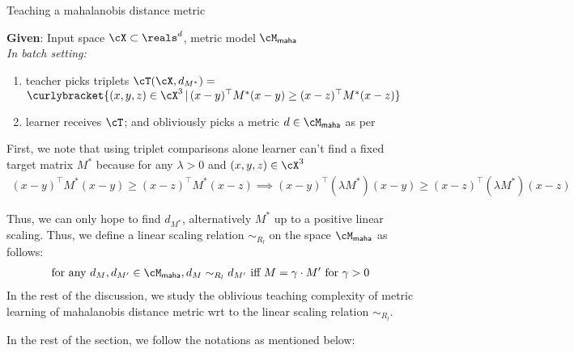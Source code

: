 \begin{algorithm}[H]
\caption{Teaching a mahalanobis distance metric}
\label{alg: maha}
\textbf{Given}: Input space $\cX \subset \reals^d$, metric model $\cM_{\mathsf{maha}}$\\
\vspace{1mm}
\textit{In batch setting:}\vspace{1mm}
\begin{enumerate}
    \item teacher picks triplets $\cT(\cX,d_{M^*}) =$ $\curlybracket{(x,y,z) \in \cX^3 \,|\, (x-y)^{\top}M^*(x-y) \ge (x-z)^{\top}M^*(x-z)}$
    \item learner receives $\cT$; and obliviously picks a metric $d \in \cM_{\mathsf{maha}}$ as per 
\end{enumerate}
\end{algorithm}

First, we note that using triplet comparisons alone learner can't find a fixed target matrix $M^*$ because for any $\lambda > 0$ and $(x,y,z) \in \cX^3$
\begin{align*}
    (x-y)^{\top}M^*(x-y) \ge (x-z)^{\top}M^*(x-z) \implies (x-y)^{\top}(\lambda M^*)(x-y) \ge (x-z)^{\top}(\lambda M^*)(x-z)
\end{align*}

Thus, we can only hope to find $d_{M^*}$, alternatively $M^*$ up to a positive linear scaling. Thus, we define a linear scaling relation $\sim_{R_l}$ on the space $\cM_{\mathsf{maha}}$ as follows:
\begin{align*}
   \textnormal{for any } d_M, d_{M'} \in \cM_{\mathsf{maha}}, d_M \sim_{R_l} d_{M'} \textnormal{ iff }  M = \gamma \cdot M' \textnormal{ for } \gamma > 0
\end{align*}
In the rest of the discussion, we study the oblivious teaching complexity of metric learning of mahalanobis distance metric wrt to the linear scaling relation $\sim_{R_l}$. 

In the rest of the section, we follow the notations as mentioned below:
